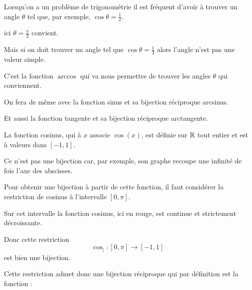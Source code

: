 







\debuttexte

\diapo

\change

Lorsqu'on a un problème de trigonométrie il est fréquent d'avoir 
à trouver un angle $\theta$ tel que, par exemple, $\cos \theta = \frac12$.

ici $\theta= \frac\pi3$ convient.

Mais si on doit trouver un angle tel que $\cos \theta = \frac13$ alors
l'angle n'est pas une valeur simple.


\change

C'est la fonction $\arccos$ qui va nous permettre de trouver les angles $\theta$ qui conviennent.

\change

On fera de même avec la fonction sinus et sa bijection réciproque arcsinus.

\change

Et aussi la fonction tangente et sa bijection réciproque arctangente.


\diapo

La fonction cosinus, qui à $x$ associe $\cos(x)$, 
est définie sur $\mathbb{R}$ tout entier et est à valeurs dans $[-1,1]$.

Ce n'est pas une bijection car, par exemple, son
graphe recoupe une infinité de fois l'axe des abscisses.

\change

Pour obtenir une bijection à partir de cette fonction, il faut considérer la restriction
de cosinus à l'intervalle $[0,\pi]$. 


\change

Sur cet intervalle la fonction cosinus, ici en rouge, est continue
et strictement décroissante.

\change

Donc cette restriction
$$\cos_| : [0,\pi] \to [-1,1]$$
est bien une bijection.

\change

Cette restriction admet donc une bijection réciproque 
qui par définition  est la fonction  :

